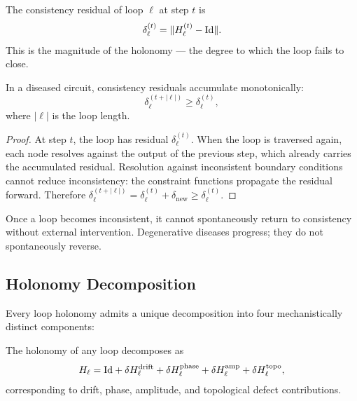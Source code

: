 \begin{definition}
\label{def:consistency-residual}
The consistency residual of loop $\ell$ at step $t$ is
\begin{equation}
  \delta_\ell^{(t)} = \|H_\ell^{(t)} - \mathrm{Id}\|.
  \label{eq:consistency-residual}
\end{equation}
This is the magnitude of the holonomy --- the degree to which the loop
fails to close.
\end{definition}

\begin{theorem}
\label{thm:accumulation}
In a diseased circuit, consistency residuals accumulate monotonically:
\begin{equation}
  \delta_\ell^{(t+|\ell|)} \geq \delta_\ell^{(t)},
\end{equation}
where $|\ell|$ is the loop length.
\end{theorem}

\begin{proof}
At step $t$, the loop has residual $\delta_\ell^{(t)}$.  When the loop is
traversed again, each node resolves against the output of the previous
step, which already carries the accumulated residual.  Resolution against
inconsistent boundary conditions cannot reduce inconsistency: the
constraint functions propagate the residual forward.  Therefore
$\delta_\ell^{(t+|\ell|)} = \delta_\ell^{(t)} + \delta_{\mathrm{new}}
\geq \delta_\ell^{(t)}$.
\end{proof}

\begin{corollary}
\label{cor:progression}
Once a loop becomes inconsistent, it cannot spontaneously return to
consistency without external intervention.  Degenerative diseases
progress; they do not spontaneously reverse.
\end{corollary}

\subsection{Holonomy Decomposition}

Every loop holonomy admits a unique decomposition into four mechanistically
distinct components:

\begin{theorem}
\label{thm:holonomy-decomp}
The holonomy of any loop decomposes as
\begin{equation}
  H_\ell
  = \mathrm{Id}
  + \delta H_\ell^{\mathrm{drift}}
  + \delta H_\ell^{\mathrm{phase}}
  + \delta H_\ell^{\mathrm{amp}}
  + \delta H_\ell^{\mathrm{topo}},
  \label{eq:hol-decomp}
\end{equation}
corresponding to drift, phase, amplitude, and topological defect
contributions.
\end{theorem}

